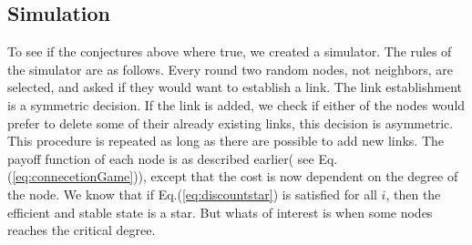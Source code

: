 \subsection{Simulation}
To see if the conjectures above where true, we created a simulator. The rules of the simulator are as follows.
Every round two random nodes, not neighbors, are selected, and asked if they would want to establish a link. The link establishment is a symmetric decision. If the link is added, we check if either of the nodes would prefer to delete some of their already existing links, this decision is asymmetric. This procedure is repeated as long as there are possible to add new links. 
The payoff function of each node is as described earlier( see Eq.(\ref{eq:connecetionGame})), except that the cost is now dependent on the degree of the node.
We know that if Eq.(\ref{eq:discountstar}) is satisfied for all $i$, then the efficient and stable state is a star. But whats of interest is when some nodes reaches the critical degree.

